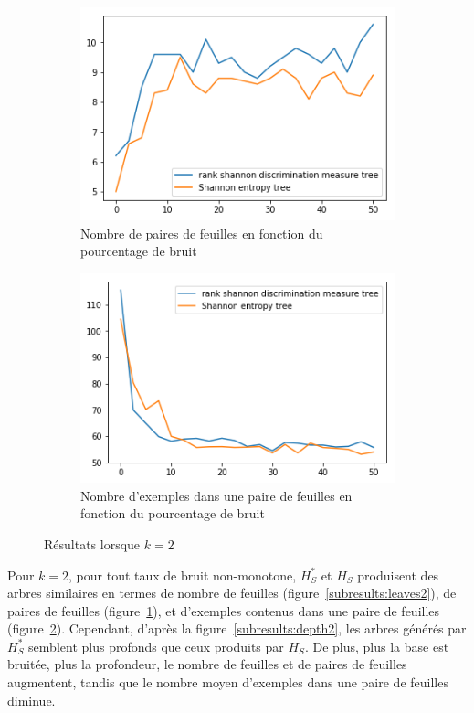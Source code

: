 \documentclass[a4paper]{article}
\newcommand{\figref}[1]{figure~\ref{#1}}
\begin{document}
\begin{figure}[H]
    \begin{subfigure}[c]{0.46\textwidth}
        \centering
        \includegraphics[width=\textwidth]{images/nbpairs_2.png}
        \caption{Nombre de paires de feuilles en fonction du pourcentage de bruit}
    \label{subresults:pairs2}
    \end{subfigure}
    \begin{subfigure}[c]{0.46\textwidth}
        \centering
        \includegraphics[width=\textwidth]{images/nbexamples_2.png}
        \caption{Nombre d'exemples dans une paire de feuilles en fonction du pourcentage de bruit}
    \label{subresults:ex2}
    \end{subfigure}

    \caption{Résultats lorsque $k=2$}
    \label{results:artificial2}
\end{figure}

Pour $k=2$, pour tout taux de bruit non-monotone, $H^*_S$ et $H_S$ produisent
des arbres similaires en termes de nombre de feuilles
(\figref{subresults:leaves2}), de paires de feuilles
(\figref{subresults:pairs2}), et d'exemples contenus dans une paire de feuilles
(\figref{subresults:ex2}). Cependant, d'après la \figref{subresults:depth2}, les
arbres générés par $H^*_S$ semblent plus profonds que ceux produits par $H_S$.
De plus, plus la base est bruitée, plus la profondeur, le nombre de feuilles et
de paires de feuilles augmentent, tandis que le nombre moyen d'exemples dans une
paire de feuilles diminue. 
\end{document}
